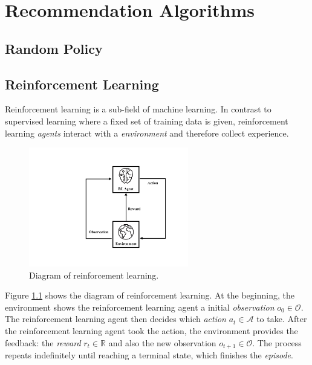 
\chapter{Recommendation Algorithms}


\section{Random Policy}


\section{Reinforcement Learning}

    Reinforcement learning is a sub-field of machine learning.
    In contrast to supervised learning where a fixed set of training data is given,
    reinforcement learning \emph{agents} interact with a \emph{environment} and therefore collect experience.

    \begin{figure}[!htp]
        \centering
        \includegraphics[width=0.62\textwidth]{img/rl.pdf}
        \caption{Diagram of reinforcement learning.}
        \label{fig:rl}
    \end{figure}

    Figure \ref{fig:rl} shows the diagram of reinforcement learning.
    At the beginning, the environment shows the reinforcement learning agent
    a initial \emph{observation} $o_0 \in \mathcal{O}$.
    The reinforcement learning agent then decides which \emph{action} $a_t \in \mathcal{A}$ to take.
    After the reinforcement learning agent took the action,
    the environment provides the feedback: the \emph{reward} $r_t \in \mathbb{R}$
    and also the new observation $o_{t+1} \in \mathcal{O}$.
    The process repeats indefinitely until reaching a terminal state,
    which finishes the \emph{episode}.


